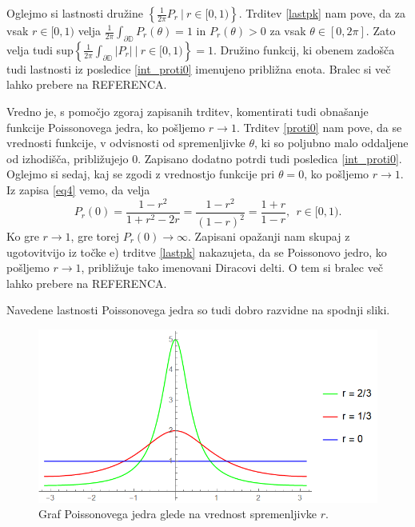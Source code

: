 \documentclass[mat1, tisk]{fmfdelo}
\begin{document}
    Oglejmo si lastnosti družine $\left\{ \frac{1}{2 \pi} P_r~|~r \in [0,1)\right\}$. Trditev \ref{lastpk} nam pove, da za vsak $r \in [0,1)$ velja $\frac{1}{2\pi}\int_{\partial \mathbb{D}}{P_r(\theta)} = 1$ in $P_r(\theta) > 0$ za vsak $\theta \in [0, 2 \pi]$.
    Zato velja tudi sup$\left\{\frac{1}{2 \pi}\int_{\partial \mathbb{D}}{\left| P_{r}\right|}~|~r \in [0,1)\right\}= 1$. Družino funkcij, ki obenem zadošča tudi lastnosti iz posledice \ref{int_proti0} imenujeno približna enota. 
    Bralec si več lahko prebere na REFERENCA.
 
    Vredno je, s pomočjo zgoraj zapisanih trditev, komentirati tudi obnašanje funkcije Poissonovega jedra, ko pošljemo $r \to 1$. Trditev \ref{proti0} nam pove, da se vrednosti funkcije, v odvisnosti od spremenljivke $\theta$, ki so poljubno malo oddaljene od izhodišča, približujejo $0$. 
    Zapisano dodatno potrdi tudi posledica \ref{int_proti0}.
    Oglejmo si sedaj, kaj se zgodi z vrednostjo funkcije pri $\theta = 0$, ko pošljemo $r \to 1$. Iz zapisa \eqref{eq4} vemo, da velja
    $$
    P_r(0) = \frac{1-r^2}{1+ r^2 - 2r} = \frac{1- r^2}{(1 - r)^2} = \frac{1 + r}{1 -r},~~r \in [0,1).
    $$
    Ko gre $r \to 1$, gre torej $P_r(0) \to \infty$. Zapisani opažanji nam skupaj z ugotovitvijo iz točke e) trditve \ref{lastpk} nakazujeta, da se Poissonovo jedro, ko pošljemo $r \to 1$, približuje tako imenovani Diracovi delti. 
    O tem si bralec več lahko prebere na REFERENCA.

    Navedene lastnosti Poissonovega jedra so tudi dobro razvidne na spodnji sliki. 

    \begin{figure}[H]
        \begin{center}
        \includegraphics[width=\linewidth]{grafi.png}
        \caption{Graf Poissonovega jedra glede na vrednost spremenljivke $r$.}
        \end{center}    
    \end{figure}
\end{document}
